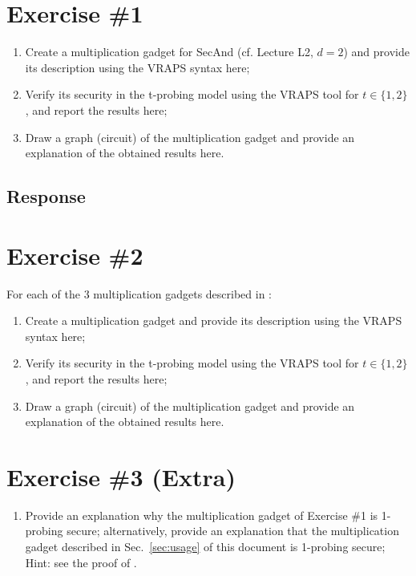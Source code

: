 \documentclass{article}
\begin{document}
\section*{Exercise \#1}

\begin{enumerate}
  \item Create a multiplication gadget for SecAnd (cf. Lecture L2, $d=2$) and provide its description using the VRAPS syntax here;
  \item Verify its security in the t-probing model using the VRAPS tool for $t\in\{1,2\}$, and report the results here;
  \item Draw a graph (circuit) of the multiplication gadget and provide an explanation of the obtained results here.
\end{enumerate}

\subsection*{Response}


\section*{Exercise \#2}

For each of the 3 multiplication gadgets described in \cite[Sec.3, p.11]{DBLP:conf/crypto/BelaidCPRT20}:
\begin{enumerate}
  \item Create a multiplication gadget and provide its description using the VRAPS syntax here;
  \item Verify its security in the t-probing model using the VRAPS tool for $t\in\{1,2\}$, and report the results here;
  \item Draw a graph (circuit) of the multiplication gadget and provide an explanation of the obtained results here.
\end{enumerate}

\section*{Exercise \#3 (Extra)}
\begin{enumerate}
  \item Provide an explanation why the multiplication gadget of Exercise \#1 is 1-probing secure; alternatively, provide an explanation that
the multiplication gadget described in Sec.~\ref{sec:usage} of this document is 1-probing secure; Hint: see the proof of \cite[Th.
1]{DBLP:conf/crypto/IshaiSW03}.
\end{enumerate}

\printbibliography
\end{document}
